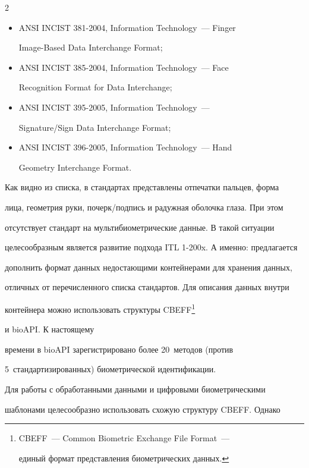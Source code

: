 \begin{multicols}{2}
\begin{itemize}
Interchange Format;

\item ANSI INCIST 381-2004, Information Technology~--- Finger 

Image-Based Data Interchange Format;

\item ANSI INCIST 385-2004, Information Technology~--- Face 

Recognition Format for Data Interchange;

\item ANSI INCIST 395-2005, Information Technology~--- 

Signature/Sign Data Interchange Format;

\item ANSI INCIST 396-2005, Information Technology~--- Hand 

Geometry Interchange Format.

  \end{itemize}

  

 

  Как видно из списка, в стандартах представлены отпечатки пальцев, форма 

лица, геометрия руки, почерк/подпись и радужная оболочка глаза. При этом 

отсутствует стандарт на мультибиометрические данные. В такой ситуации 

целесообразным является развитие подхода ITL 1-200x. А именно: предлагается 

дополнить формат данных недостающими контейнерами для хранения данных, 

отличных от перечисленного списка стандартов. Для описания данных внутри 

контейнера можно использовать структуры CBEFF\footnote{CBEFF~--- Common Biometric Exchange File Format~---

единый формат представления биометрических данных.} 

и bioAPI. К настоящему 

времени в bioAPI зарегистрировано более 20~методов (против 

5~стандартизированных) биометрической идентификации. 





  Для работы с обработанными данными и цифровыми биометрическими 

шаблонами целесообразно использовать схожую структуру CBEFF. Однако 


\end{multicols}

